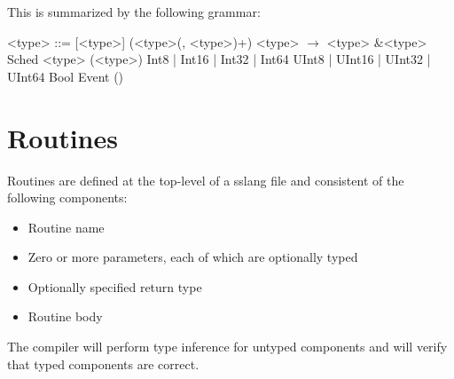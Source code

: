 \documentclass{article}
\begin{document}
\noindent This is summarized by the following grammar:
\setlength{\grammarindent}{5em}
\begin{grammar}
<type> ::= [<type>]
\alt (<type>(, <type>)+)
\alt <type> $\rightarrow$ <type>
\alt \&<type>
\alt Sched <type>
\alt (<type>)
\alt Int8 | Int16 | Int32 | Int64
\alt UInt8 | UInt16 | UInt32 | UInt64
\alt Bool
\alt Event
\alt ()
\end{grammar}

\section{Routines}
\noindent Routines are defined at the top-level of a sslang file and consistent of the following components:
\begin{itemize}
    \item Routine name
    \item Zero or more parameters, each of which are optionally typed
    \item Optionally specified return type
    \item Routine body
\end{itemize}
\noindent The compiler will perform type inference for untyped components and will verify that typed components are correct.
\end{document}
